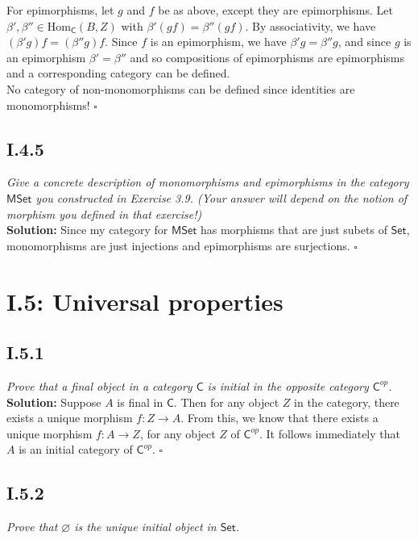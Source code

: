 \documentclass[11pt,a4paper]{article}
\newcommand{\morph}[3]{\text{Hom}_{#1}(#2,#3)}
\begin{document}
\noindent For epimorphisms, let $g$ and $f$ be as above, except they are epimorphisms.  Let $\beta', \beta'' \in \morph{\textsf{C}}{B}{Z}$ with $\beta'(gf) = \beta''(gf)$.  By associativity, we have $(\beta' g)f = (\beta'' g)f$.  Since $f$ is an epimorphism, we have $\beta' g = \beta'' g$, and since $g$ is an epimorphism $\beta' = \beta''$ and so compositions of epimorphisms are epimorphisms and a corresponding category can be defined. \\

\noindent  No category of non-monomorphisms can be defined since identities are monomorphisms! $\square$


\subsection*{I.4.5} \textit{Give a concrete description of monomorphisms and epimorphisms in the category $\textsf{MSet}$ you constructed in Exercise 3.9. (Your answer will depend on the notion of morphism you defined in that exercise!)} \\

\noindent\textbf{Solution: }  Since my category for $\textsf{MSet}$ has morphisms that are just subets of $\textsf{Set}$, monomorphisms are just injections and epimorphisms are surjections. $\square$

\newpage

\section*{I.5: Universal properties} 

\subsection*{I.5.1} \textit{Prove that a final object in a category $\textsf{C}$ is initial in the opposite category $\textsf{C}^{op}$.}\\

\noindent \textbf{Solution: }  Suppose $A$ is final in $\textsf{C}$.  Then for any object $Z$ in the category, there exists a unique morphism $f:Z \rightarrow A$.  From this, we know that there exists a unique morphism $f: A \rightarrow Z$, for any object $Z$ of $\textsf{C}^{op}$.  It follows immediately that $A$ is an initial category of $\textsf{C}^{op}$. $\square$

\subsection*{I.5.2} \textit{Prove that $\varnothing$ is the unique initial object in $\textsf{Set}$.} \\
\end{document}
